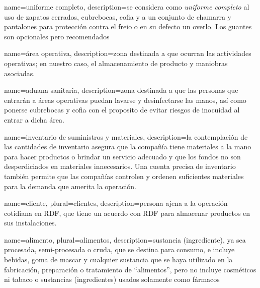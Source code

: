 {
    name=uniforme completo,
    description={se considera como \textit{uniforme completo} al uso de zapatos cerrados, cubrebocas, cofia y a un conjunto de chamarra y pantalones para protección contra el freio o en su defecto un overlo. Los guantes son opcionales pero recomendados}
}

{
    name=área operativa,
    description={zona destinada a que ocurran las actividades operativas; en nuestro caso, el almacenamiento de producto y maniobras asociadas.}
}



{
    name=aduana sanitaria,
    description={zona destinada a que las personas que entrarán a áreas operativas puedan lavarse y desinfectarse las manos, así como ponerse cubrebocas y cofia con el proposito de evitar riesgos de inocuidad al entrar a dicha área.}
}

{
    name=inventario de suministros y materiales,
    description=la contemplación de las cantidades de inventario asegura que la compañía tiene materiales a la mano para hacer productos o brindar un servicio adecuado y que los fondos no son desperdiciados en materiales innecesarios. Una cuenta precisa de inventario también permite que las compañías controlen y ordenen suficientes materiales para la demanda que amerita la operación.
}

{
    name=cliente,
    plural=clientes,
    description={persona ajena a la operación cotidiana en RDF, que tiene un acuerdo con RDF para almacenar productos en sus instalaciones.}
}

{
    name={alimento},
    plural={alimentos},
    description={sustancia (ingrediente), ya sea procesada, semi-procesada o cruda, que se destina para consumo, e incluye bebidas, goma de mascar y cualquier sustancia que se haya utilizado en la fabricación, preparación o tratamiento de “alimentos”, pero no incluye cosméticos ni tabaco o sustancias (ingredientes) usados solamente como fármacos}
}

